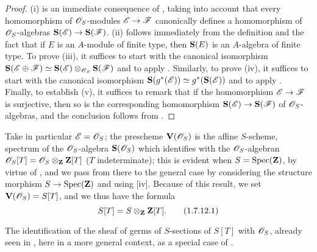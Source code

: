 \begin{proof}
(i) is an immediate consequence of , taking into account that every homomorphism of $\mathscr{O}_S$-modules $\sh{E}\to\sh{F}$ canonically defines a homomorphism of $\mathscr{O}_S$-algebras $\bb{S}(\sh{E})\to\bb{S}(\sh{F})$.
(ii) follows immediately from the definition  and the fact that if $E$ is an $A$-module of finite type, then $\mathbf{S}(E)$ is an $A$-algebra of finite type.
To prove (iii), it suffices to start with the canonical isomorphism $\mathbf{S}(\mathscr{E}\oplus\mathscr{F})\simeq\mathbf{S}(\mathscr{E})\otimes_{\mathscr{O}_S}\mathbf{S}(\mathscr{F})$  and to apply .
Similarly, to prove (iv), it suffices to start with the canonical isomorphism $\mathbf{S}(g^*(\mathscr{E}))\simeq g^*(\mathbf{S}(\mathscr{E}))$  and to apply .
Finally, to establish (v), it suffices to remark that if the homomorphism $\sh{E}\to\sh{F}$ is surjective, then so is the corresponding homomorphism $\bb{S}(\sh{E})\to\bb{S}(\sh{F})$ of $\mathscr{O}_S$-algebras, and the conclusion follows from .
\end{proof}

\begin{env}[1.7.12]
\label{II.1.7.12}
Take in particular $\mathscr{E}=\mathscr{O}_S$; the prescheme $\mathbf{V}(\mathscr{O}_S)$ is the affine $S$-scheme, spectrum of the $\mathscr{O}_S$-algebra $\mathbf{S}(\mathscr{O}_S)$ which identifies with the $\mathscr{O}_S$-algebran $\mathscr{O}_S[T]=\mathscr{O}_S\otimes_\mathbf{Z}\mathbf{Z}[T]$
($T$ indeterminate); this is evident when $S=\operatorname{Spec}(\mathbf{Z})$, by virtue of , and we pass from there to the general case by considering the structure morphism $S\to\Spec(\bb{Z})$ and using [iv].
Because of this result, we set $\mathbf{V}(\mathscr{O}_S)=S[T]$, and we thus have the formula
\[
\label{II.1.7.12.1}
  S[T]=S\otimes_\mathbf{Z}\mathbf{Z}[T].
  \tag{1.7.12.1}
\]

The identification of the sheaf of germs of $S$-sections of $S[T]$ with $\mathscr{O}_S$, already seen in , here in a more general context, as a special case of .
\end{env}

